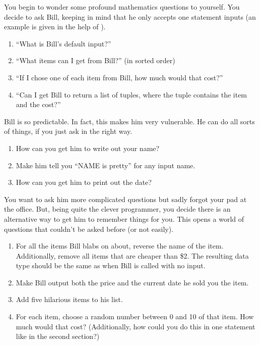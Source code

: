\documentclass[10pt, letterpaper, acro-macros]{python-problem}
\begin{document}
You begin to wonder some profound mathematics questions to yourself. You
decide to ask Bill, keeping in mind that he only accepts one statement
inputs (an example is given in the help of ).

\begin{enumerate}[resume]
  \item ``What is Bill's default input?''
  \item ``What items can I get from Bill?'' (in sorted order)
  \item ``If I chose one of each item from Bill, how much would that
    cost?''
  \item ``Can I get Bill to return a list of tuples, where the tuple
    contains the item and the cost?''
\end{enumerate}

Bill is so predictable. In fact, this makes him very vulnerable. He can do
all sorts of things, if you just ask in the right way.

\begin{enumerate}[resume]
  \item How can you get him to write out your name?
  \item Make him tell you ``NAME is pretty'' for any input name.
  \item How can you get him to print out the date?
\end{enumerate}

You want to ask him more complicated questions but sadly forgot your pad at
the office. But, being quite the clever programmer, you decide there is an
alternative way to get him to remember things for you. This opens a world of
questions that couldn't be asked before (or not easily).

\begin{enumerate}[resume]
  \item For all the items Bill blabs on about, reverse the name of the item.
    Additionally, remove all items that are cheaper than \$2. The resulting
    data type should be the same as when Bill is called with no input.
  \item Make Bill output both the price and the current date he sold you the
    item.
  \item Add five hilarious items to his list.
  \item For each item, choose a random number between 0 and 10 of that item.
    How much would that cost? (Additionally, how could you do this in one
    statement like in the second section?)
\end{enumerate}
\end{document}
